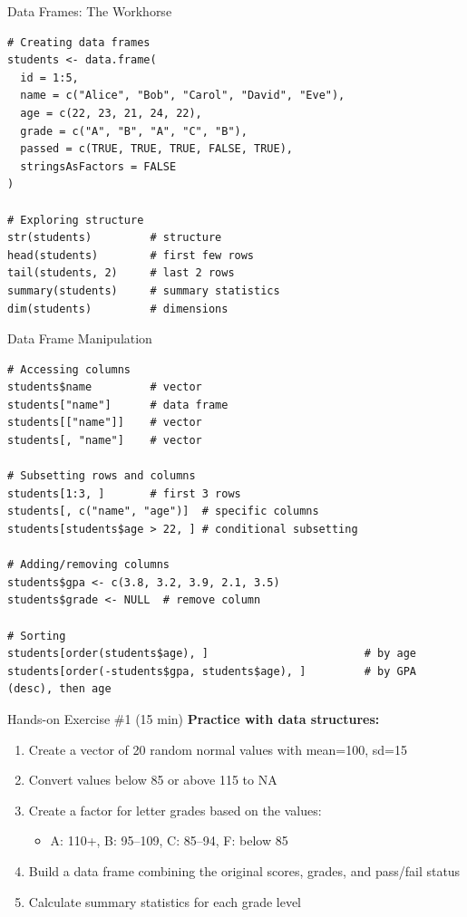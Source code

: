 \documentclass[aspectratio=169]{beamer}
\begin{document}
\begin{frame}[fragile]{Data Frames: The Workhorse}
\begin{lstlisting}
# Creating data frames
students <- data.frame(
  id = 1:5,
  name = c("Alice", "Bob", "Carol", "David", "Eve"),
  age = c(22, 23, 21, 24, 22),
  grade = c("A", "B", "A", "C", "B"),
  passed = c(TRUE, TRUE, TRUE, FALSE, TRUE),
  stringsAsFactors = FALSE
)

# Exploring structure
str(students)         # structure
head(students)        # first few rows
tail(students, 2)     # last 2 rows
summary(students)     # summary statistics
dim(students)         # dimensions
\end{lstlisting}
\end{frame}

\begin{frame}[fragile]{Data Frame Manipulation}
\begin{lstlisting}
# Accessing columns
students$name         # vector
students["name"]      # data frame
students[["name"]]    # vector
students[, "name"]    # vector

# Subsetting rows and columns
students[1:3, ]       # first 3 rows
students[, c("name", "age")]  # specific columns
students[students$age > 22, ] # conditional subsetting

# Adding/removing columns
students$gpa <- c(3.8, 3.2, 3.9, 2.1, 3.5)
students$grade <- NULL  # remove column

# Sorting
students[order(students$age), ]                        # by age
students[order(-students$gpa, students$age), ]         # by GPA (desc), then age
\end{lstlisting}
\end{frame}

\begin{frame}{Hands-on Exercise \#1 (15 min)}
  \textbf{Practice with data structures:}
  \begin{enumerate}
    \item Create a vector of 20 random normal values with mean=100, sd=15
    \item Convert values below 85 or above 115 to NA
    \item Create a factor for letter grades based on the values:
      \begin{itemize}
        \item A: 110+, B: 95--109, C: 85--94, F: below 85
      \end{itemize}
    \item Build a data frame combining the original scores, grades, and pass/fail status
    \item Calculate summary statistics for each grade level
  \end{enumerate}
\end{frame}
\end{document}
